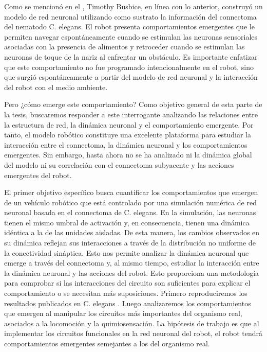  Como se mencionó en el , Timothy Busbice, en línea con lo anterior, construyó un modelo de red neuronal utilizando como sustrato la información del connectoma del nematodo C. elegans. El robot presenta comportamientos emergentes que le permiten navegar espontáneamente cuando se estimulan las neuronas sensoriales asociadas con la presencia de alimentos y retroceder cuando se estimulan las neuronas de toque de la nariz al enfrentar un obstáculo. Es importante enfatizar que este comportamiento no fue programado intencionalmente en el robot, sino que surgió espontáneamente a partir del modelo de red neuronal y la interacción del robot con el medio ambiente.
 
 Pero ¿cómo emerge este comportamiento? Como objetivo general de esta parte de la tesis, buscaremos responder a este interrogante analizando las relaciones entre la estructura de red, la dinámica neuronal y el comportamiento emergente. Por tanto, el modelo robótico constituye una excelente plataforma para estudiar la interacción entre el connectoma, la dinámica neuronal y los comportamientos emergentes. Sin embargo, hasta ahora no se ha analizado ni la dinámica global del modelo ni su correlación con el connectoma subyacente y las acciones emergentes del robot.
 
 

 
 El primer objetivo específico busca cuantificar los comportamientos que emergen de un vehículo robótico que está controlado por una simulación numérica de red neuronal basada en el connectoma de C. elegans. En la simulación, las neuronas tienen el mismo umbral de activación y, en consecuencia, tienen una dinámica idéntica a la de las unidades aisladas. De esta manera, los cambios observados en su dinámica reflejan sus interacciones a través de la distribución no uniforme de la conectividad sináptica. Esto nos permite analizar la dinámica neuronal que emerge a través del connectoma y, al mismo tiempo, estudiar la interacción entre la dinámica neuronal y las acciones del robot. Esto proporciona una metodología para comprobar si las interacciones del circuito son suficientes para explicar el comportamiento o se necesitan más suposiciones. Primero reproduciremos los resultados publicados en C. elegans \cite{busbice_extending_nodate}. Luego analizaremos los comportamientos que emergen al manipular los circuitos más importantes del organismo real, asociados a la locomoción y la quimiosensación. La hipótesis de trabajo es que al implementar los circuitos funcionales en la red neuronal del robot, el robot tendrá comportamientos emergentes semejantes a los del organismo real.
 
